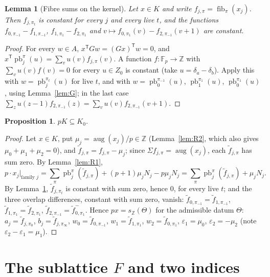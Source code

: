 \documentclass[11pt]{article}
\newtheorem{lemma}[theorem]{Lemma}
\newtheorem{proposition}[theorem]{Proposition}
\theoremstyle{definition}
\theoremstyle{remark}
\newcommand{\Z}{\mathbb{Z}}
\newcommand{\F}{\mathbb{F}}
\newcommand{\pb}{\operatorname{pb}}
\newcommand{\fib}{\operatorname{fib}}
\newcommand{\aug}{\operatorname{aug}}
\newcommand{\SAT}{K_0}
\begin{document}
\begin{lemma}[Fibre sums on the kernel]\label{lem:census}
Let $x\in K$ and write $f_{j,\pi}=\fib_\pi(x_j)$. Then $f_{j,\pi_t}$ is constant for every $j$ and every live $t$, and the functions $f_{0,\pi_{-1}}-f_{1,\pi_{-1}}$, $f_{1,\pi_1}-f_{2,\pi_1}$ and $v\mapsto f_{0,\pi_1}(v)-f_{2,\pi_{-1}}(v+1)$ are constant.
\end{lemma}

\begin{proof}
For every $w\in A$, $x^{\mathsf T}Gw=(Gx)^{\mathsf T}w=0$, and $x^{\mathsf T}\pb_j^\pi(u)=\sum_vu(v)f_{j,\pi}(v)$. A function $f:\F_p\to\Z$ with $\sum_vu(v)f(v)=0$ for every $u\in Z_0$ is constant (take $u=\delta_a-\delta_b$). Apply this with $w=\pb_j^{\pi_t}(u)$ for live $t$, and with $w=\pb_0^{\pi_{-1}}(u)$, $\pb_1^{\pi_1}(u)$, $\pb_0^{\pi_1}(u)$, using Lemma~\ref{lem:G}; in the last case $\sum_zu(z-1)f_{2,\pi_{-1}}(z)=\sum_vu(v)f_{2,\pi_{-1}}(v+1)$.
\end{proof}

\begin{proposition}\label{prop:mK}
$pK\subseteq\SAT$.
\end{proposition}

\begin{proof}
Let $x\in K$, put $\mu_j=\aug(x_j)/p\in\Z$ (Lemma~\ref{lem:R2}, which also gives $\mu_0+\mu_1+\mu_2=0$), and $\tilde f_{j,\pi}=f_{j,\pi}-\mu_j$; since $\Sigma f_{j,\pi}=\aug(x_j)$, each $\tilde f_{j,\pi}$ has sum zero. By Lemma~\ref{lem:R1},
\[
p\cdot x_j\big|_{\text{family }j}=\sum_\pi\pb_j^\pi(\tilde f_{j,\pi})+(p+1)\mu_jN_j-p\mu_jN_j=\sum_\pi\pb_j^\pi(\tilde f_{j,\pi})+\mu_jN_j .
\]
By Lemma~\ref{lem:census}, $\tilde f_{j,\pi_t}$ is constant with sum zero, hence $0$, for every live $t$; and the three overlap differences, constant with sum zero, vanish: $\tilde f_{0,\pi_{-1}}=\tilde f_{1,\pi_{-1}}$, $\tilde f_{1,\pi_1}=\tilde f_{2,\pi_1}$, $\tilde f_{2,\pi_{-1}}=\tilde f_{0,\pi_1}^-$. Hence $px=s_\Z(\Theta)$ for the admissible datum $\Theta$: $a_j=\tilde f_{j,\pi_0}$, $b_j=\tilde f_{j,\pi_\infty}$, $w_0=\tilde f_{0,\pi_{-1}}$, $w_1=\tilde f_{1,\pi_1}$, $w_2=\tilde f_{0,\pi_1}$, $\varepsilon_1=\mu_0$, $\varepsilon_2=-\mu_2$ (note $\varepsilon_2-\varepsilon_1=\mu_1$).
\end{proof}

\section{The sublattice \texorpdfstring{$F$}{F} and two indices}\label{sec:F}
\end{document}
